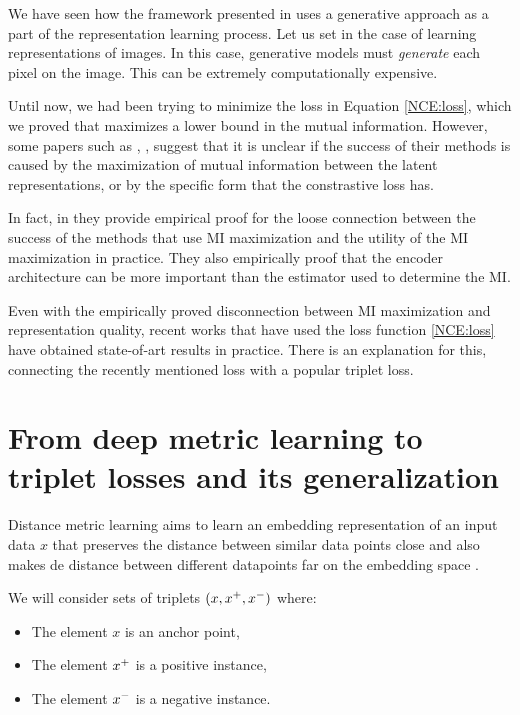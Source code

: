 \label{Chapter:connection:triplets}
We have seen how the framework presented in \cite{oord_representation_2019} uses a generative approach as a part of the representation learning process. Let us set in the case of learning representations of images. In this case, generative models must \emph{generate} each pixel on the image. This can be extremely computationally expensive. 

Until now, we had been trying to minimize the loss in Equation \eqref{NCE:loss}, which we proved that maximizes a lower bound in the mutual information. However, some papers such as \cite{chen_simple_2020}, \cite{tschannen_mutual_2020}, suggest that it is unclear if the success of their methods is caused by the maximization of mutual information between the latent representations, or by the specific form that the constrastive loss has.

In fact, in \cite{tschannen_mutual_2020} they provide empirical proof for the loose connection between the success of the methods that use MI maximization and the utility of the MI maximization in practice. They also empirically proof  that the encoder architecture can be more important than the estimator used to determine the MI.

Even with the empirically proved disconnection between MI maximization and representation quality, recent works that have used the loss function \ref{NCE:loss} have obtained state-of-art results in practice. There is an explanation for this, connecting the recently mentioned loss with a popular triplet loss.

\section{From deep metric learning to triplet losses and its generalization}

Distance metric learning aims to learn an embedding representation of an input data $x$ that preserves the distance between similar data points close and also makes de distance between different datapoints far on the embedding space \citep{Sohn2016ImprovedDM}.

We will consider sets of triplets $(x,x^+,x^-)$ where:
\begin{itemize}
\item The element $x$ is an anchor point,
\item The element $x^+$ is a positive instance,
\item The element $x^-$ is a negative instance.
\end{itemize}

